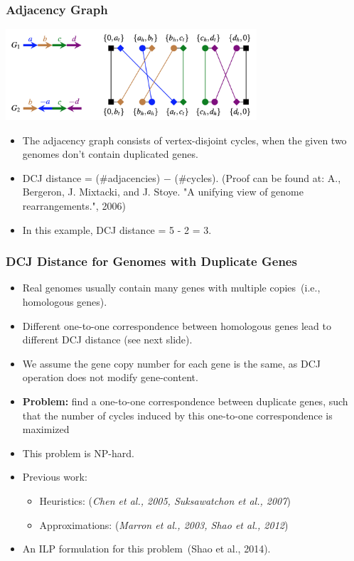 \documentclass[mathserif]{beamer}
\begin{document}
\frame
{
	\frametitle{Adjacency Graph}

	\begin{center}
		\includegraphics[width=0.7\textwidth]{L8-DCJ5.png}
	\end{center}

	\begin{itemize}
	\item<1-> The adjacency graph consists of vertex-disjoint cycles, when the
		given two genomes don't contain duplicated genes.
	\item<1-> DCJ distance = (\#adjacencies) $-$ (\#cycles). (\small Proof can be found at:
			A., Bergeron, J. Mixtacki, and J. Stoye. "A unifying view of genome rearrangements.", 2006)
	\item<1-> In this example, DCJ distance = 5 - 2 = 3.

	\end{itemize}
}

\frame
{
	\frametitle{\fontsize{0.483cm}{1em}\selectfont DCJ Distance for Genomes with Duplicate Genes}

	\begin{itemize}

	\item<1-> Real genomes usually contain many genes with multiple copies~(i.e., homologous genes).
	\vspace{0.1cm}

	\item<1-> Different one-to-one correspondence between homologous genes lead to different
		DCJ distance (see next slide).

	\item<1-> We assume the gene copy number for each gene is the same, as DCJ operation does not modify gene-content.


	\item<1-> {\bf Problem:} find a one-to-one correspondence between duplicate genes, 
		such that the number of cycles induced by this one-to-one correspondence is maximized
	\item<1-> This problem is NP-hard.
	\item<1-> {Previous work:} 
		\begin{itemize}
		\item {Heuristics:} ({\it Chen et al., 2005, Suksawatchon et al., 2007})
		\item {Approximations:} ({\it Marron et al., 2003, Shao et al., 2012})
		\end{itemize}

	\item<1-> An ILP formulation for this problem~(Shao et al., 2014).
	\end{itemize}
}
\end{document}
